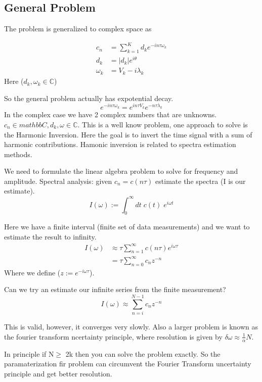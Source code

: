 \documentclass{article}
\newcommand{\be}{\begin{equation}}
\newcommand{\ee}{\end{equation}}
\begin{document}
\subsection{General Problem}
The problem is generalized to complex space as

\be
\begin{split}
    c_n &= \sum_{k=1}^K d_k e^{-in\tau \omega_k}\\
    d_k &= |d_k|e^{i\theta}\\
    \omega_k &= V_k - i\lambda_k
\end{split}
\ee
Here ($d_k,\omega_k \in \mathbb{C}$)

So the general problem actually has expotential decay.
\be
e^{-in\tau \omega_k} = e^{in\tau V_k}e^{-n\tau \lambda_k}
\ee
In the complex case we have 2 complex numbers that are unknowns. 
$c_n \in mathbb{C}, d_k, \omega \in \mathbb{C}$.
This is a well know problem, one approach to solve is the Harmonic Inversion. 
Here the goal is to invert the time signal with a sum of harmonic contributions.
Hamonic inversion is related to spectra estimation methods.

We need to formulate the linear algebra problem to solve for frequency and amplitude. 
Spectral analysis: given $c_n = c(n\tau)$ estimate the spectra (I is our estimate). 
\be
I(\omega) := \int_0^\infty dt\; c(t)\; e^{i\omega t}
\ee

Here we have a finite interval (finite set of data measurements) and we want to estimate the result to infinity. 
\be
\begin{split}
    I(\omega) &\approx \tau \sum_{n=1}^\infty c(n\tau)e^{i\omega\tau}\\
    &= \tau \sum_{n=0}^\infty c_n z^{-n} 
\end{split}
\ee
Where we define ($z:=e^{-i\omega\tau}$). 

Can we try an estimate our infinite series from the finite measurement? 
\be
I(\omega) \approx \sum_{n=i}^{N-1} c_n z^{-n}
\ee

This is valid, however, it converges very slowly.
Also a larger problem is known as the fourier transform ncertainty principle, where resolution is given by $\delta \omega \approx \frac{1}{\alpha} N$. 

In principle if N$\geq$ 2k then you can solve the problem exactly. 
So the paramaterization fir problem can circumvent the Fourier Transform uncertainty principle and get better resolution.  
\end{document}
